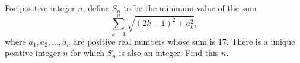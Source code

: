 For positive integer $n$, define $S_n$ to be the minimum value of the sum \[ \sum_{k=1}^n \sqrt{(2k-1)^2+a_k^2}, \] where $a_1,a_2,\ldots,a_n$ are positive real numbers whose sum is 17. There is a unique positive integer $n$ for which $S_n$ is also an integer. Find this $n$.